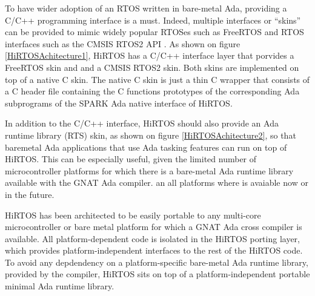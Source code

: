 \documentclass{AUJarticle}
\begin{document}
To have wider adoption of an RTOS written in bare-metal Ada, providing a C/C++ programming interface
is a must. Indeed, multiple interfaces or ``skins'' can be provided to mimic widely popular
RTOSes such as FreeRTOS \cite{freeRTOS} and RTOS interfaces such as the CMSIS RTOS2 API \cite{cmsisRTOS}.
As shown on figure \ref{HiRTOSAchitecture1}, HiRTOS has a C/C++ interface layer that porvides
a FreeRTOS skin and and a CMSIS RTOS2 skin. Both skins are implemented on top of a native C skin.
The native C skin is just a thin C wrapper that consists of a C header file containing the C
functions prototypes of the corresponding Ada subprograms of the SPARK Ada native interface of HiRTOS.

In addition to the C/C++ interface, HiRTOS should also provide an Ada runtime library (RTS) skin,
as shown on figure \ref{HiRTOSAchitecture2}, so that baremetal Ada applications that use Ada tasking
features can run on top of HiRTOS. This can be especially useful, given the limited number of
microcontroller platforms for which there is a bare-metal Ada runtime library available with the
GNAT Ada compiler. an all platforms where is avaiable now or in the future.

HiRTOS has been architected to be easily portable to any multi-core microcontroller or bare metal
platform for which a GNAT Ada cross compiler is available. All platform-dependent code is isolated in the
HiRTOS porting layer, which provides platform-independent interfaces to the rest of the HiRTOS code.
To avoid any depdendency on a platform-specific bare-metal Ada runtime library, provided by the
compiler, HiRTOS sits on top of a platform-independent portable minimal Ada runtime library.
\end{document}
